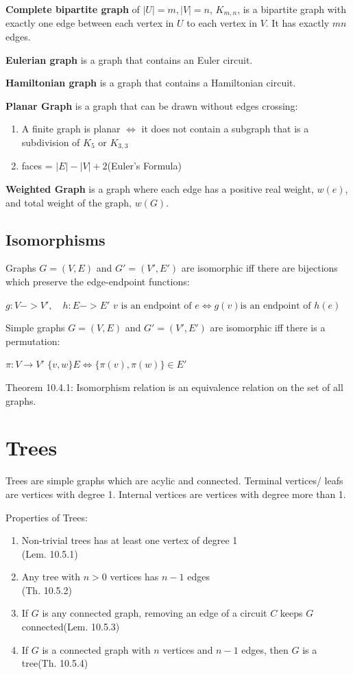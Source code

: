 \documentclass[12pt, a4paper]{article}
\begin{document}
\begin{multicols*}{3}
\textbf{Complete bipartite graph} of $|U|=m, |V|=n$, $K_{m,n}$, is a bipartite graph with exactly one edge between each vertex in $U$ to each vertex in $V$. It has exactly $mn$ edges. 

\textbf{Eulerian graph} is a graph that contains an Euler circuit.

\textbf{Hamiltonian graph} is a graph that contains a Hamiltonian circuit.

\textbf{Planar Graph} is a graph that can be drawn without edges crossing:
\begin{enumerate}[\roman*.]
  \item A finite graph is planar $\iff$ it does not contain a subgraph that is a subdivision of $K_5$ or $K_{3,3}$
  \item faces = $|E| - |V| + 2$\hfill(Euler's Formula)
\end{enumerate}

\textbf{Weighted Graph} is a graph where each edge has a positive real weight, $w(e)$, and total weight of the graph, $w(G)$.
\subsection{Isomorphisms}
Graphs $G = (V, E)$ and $G' = (V', E')$ are isomorphic iff there are bijections which preserve the edge-endpoint functions:\\
{\centering
  $g: V -> V',\quad h: E->E'$
  $v\text{ is an endpoint of }e \iff g(v)\text{is an endpoint of }h(e)$
\par}

Simple graphs $G = (V, E)$ and $G' = (V', E')$ are isomorphic iff there is a permutation:\\
{\centering
  $\pi: V \rightarrow V'$
  $\{v, w\} E \iff \{\pi(v), \pi(w)\} \in E'$
\par}
Theorem 10.4.1: Isomorphism relation is an equivalence relation on the set of all graphs.

\section{Trees}
Trees are simple graphs which are acylic and connected. Terminal vertices/ leafs are vertices with degree 1. Internal vertices are vertices with degree more than 1.

Properties of Trees:
\begin{enumerate}[\roman*.]
  \item Non-trivial trees has at least one vertex of degree 1\\\hfill(Lem. 10.5.1)
  \item Any tree with $n>0$ vertices has $n-1$ edges\\\hfill(Th. 10.5.2)
  \item If $G$ is any connected graph, removing an edge of a circuit $C$ keeps $G$ connected\hfill(Lem. 10.5.3)
  \item If $G$ is a connected graph with $n$ vertices and $n-1$ edges, then $G$ is a tree\hfill(Th. 10.5.4)
\end{enumerate}


\end{multicols*}
\end{document}
